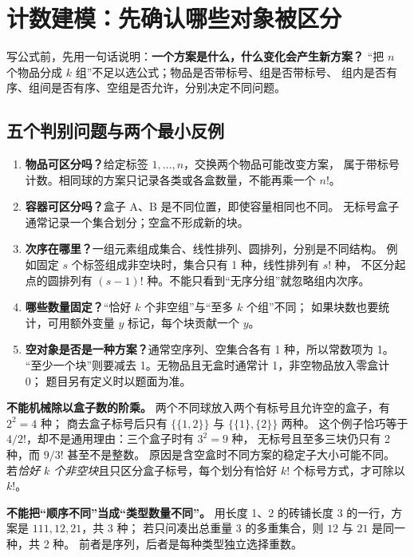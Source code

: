 \section{计数建模：先确认哪些对象被区分}\label{knowledge-counting-model}
写公式前，先用一句话说明：\textbf{一个方案是什么，什么变化会产生新方案？}
“把 $n$ 个物品分成 $k$ 组”不足以选公式；物品是否带标号、组是否带标号、
组内是否有序、组间是否有序、空组是否允许，分别决定不同问题。

\subsection{五个判别问题与两个最小反例}
\begin{enumerate}
\item \textbf{物品可区分吗？}给定标签 $1,\ldots,n$，交换两个物品可能改变方案，
属于带标号计数。相同球的方案只记录各类或各盒数量，不能再乘一个 $n!$。
\item \textbf{容器可区分吗？}盒子 A、B 是不同位置，即使容量相同也不同。
无标号盒子通常记录一个集合划分；空盒不形成新的块。
\item \textbf{次序在哪里？}一组元素组成集合、线性排列、圆排列，分别是不同结构。
例如固定 $s$ 个标签组成非空块时，集合只有 1 种，线性排列有 $s!$ 种，
不区分起点的圆排列有 $(s-1)!$ 种。不能只看到“无序分组”就忽略组内次序。
\item \textbf{哪些数量固定？}“恰好 $k$ 个非空组”与“至多 $k$ 个组”不同；
如果块数也要统计，可用额外变量 $y$ 标记，每个块贡献一个 $y$。
\item \textbf{空对象是否是一种方案？}通常空序列、空集合各有 1 种，所以常数项为 1。
“至少一个块”则要减去 1。无物品且无盒时通常计 1，非空物品放入零盒计 0；
题目另有定义时以题面为准。
\end{enumerate}

\textbf{不能机械除以盒子数的阶乘。}
两个不同球放入两个有标号且允许空的盒子，有 $2^2=4$ 种；
商去盒子标号后只有 $\{\{1,2\}\}$ 与 $\{\{1\},\{2\}\}$ 两种。
这个例子恰巧等于 $4/2!$，却不是通用理由：三个盒子时有 $3^2=9$ 种，
无标号且至多三块仍只有 2 种，而 $9/3!$ 甚至不是整数。
原因是含空盒时不同方案的稳定子大小可能不同。
若\emph{恰好 $k$ 个非空块}且只区分盒子标号，每个划分有恰好 $k!$ 个标号方式，才可除以 $k!$。

\textbf{不能把“顺序不同”当成“类型数量不同”。}
用长度 1、2 的砖铺长度 3 的一行，方案是 $111,12,21$，共 3 种；
若只问凑出总重量 3 的多重集合，则 $12$ 与 $21$ 是同一种，共 2 种。
前者是序列，后者是每种类型独立选择重数。

